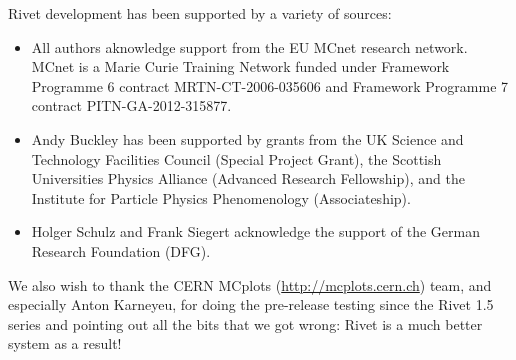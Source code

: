 Rivet development has been supported by a variety of sources:

\begin{itemize}
\item All authors aknowledge support from the EU MCnet research network. MCnet
  is a Marie Curie Training Network funded under Framework Programme 6
  contract MRTN-CT-2006-035606 and Framework Programme 7 contract PITN-GA-2012-315877.
\item Andy Buckley has been supported by grants from the UK Science and
  Technology Facilities Council (Special Project Grant), the Scottish
  Universities Physics Alliance (Advanced Research Fellowship), and the
  Institute for Particle Physics Phenomenology (Associateship).
\item Holger Schulz and Frank Siegert acknowledge the support of the German
  Research Foundation (DFG).
\end{itemize}

We also wish to thank the CERN MCplots (\url{http://mcplots.cern.ch}) team, and
especially Anton Karneyeu, for doing the pre-release testing since the Rivet 1.5
series and pointing out all the bits that we got wrong: Rivet is a much better
system as a result!
